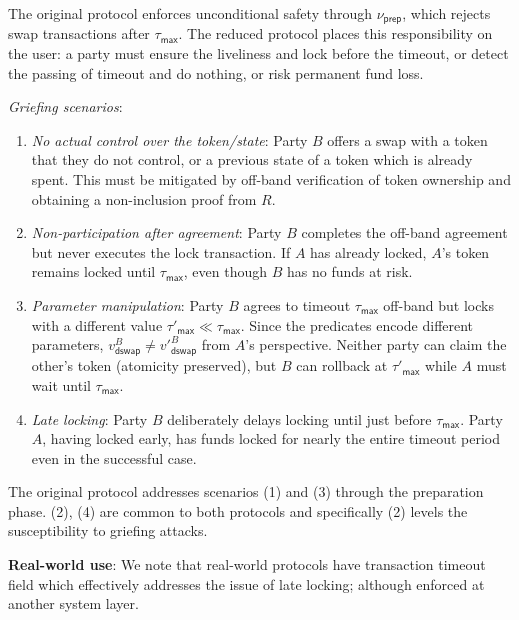 \documentclass{article}
\begin{document}
\noindent The original protocol enforces unconditional safety through $\nu_\mathsf{prep}$, which rejects swap transactions after $\tau_\mathsf{max}$. The reduced protocol places this responsibility on the user: a party must ensure the liveliness and lock before the timeout, or detect the passing of timeout and do nothing, or risk permanent fund loss.\medskip

\noindent\emph{Griefing scenarios}:
\begin{enumerate}
\item \emph{No actual control over the token/state}: Party $B$ offers a swap with a token that they do not control, or a previous state of a token which is already spent. This must be mitigated by off-band verification of token ownership and obtaining a non-inclusion proof from $R$.
\item \emph{Non-participation after agreement}: Party $B$ completes the off-band agreement but never executes the lock transaction. If $A$ has already locked, $A$'s token remains locked until $\tau_\mathsf{max}$, even though $B$ has no funds at risk.
\item \emph{Parameter manipulation}: Party $B$ agrees to timeout $\tau_\mathsf{max}$ off-band but locks with a different value $\tau'_\mathsf{max} \ll \tau_\mathsf{max}$. Since the predicates encode different parameters, $v^B_\mathsf{dswap} \neq v'^B_\mathsf{dswap}$ from $A$'s perspective. Neither party can claim the other's token (atomicity preserved), but $B$ can rollback at $\tau'_\mathsf{max}$ while $A$ must wait until $\tau_\mathsf{max}$.
\item \emph{Late locking}: Party $B$ deliberately delays locking until just before $\tau_\mathsf{max}$. Party $A$, having locked early, has funds locked for nearly the entire timeout period even in the successful case.
\end{enumerate}
\medskip

\noindent The original protocol addresses scenarios (1) and (3) through the preparation phase. (2), (4) are common to both protocols and specifically (2) levels the susceptibility to griefing attacks.\medskip

\noindent\textbf{Real-world use}: We note that real-world protocols have transaction timeout field which effectively addresses the issue of late locking; although enforced at another system layer.
\end{document}
